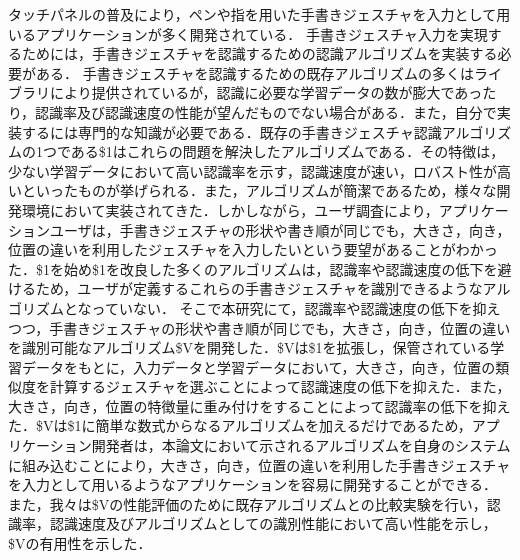 タッチパネルの普及により，ペンや指を用いた手書きジェスチャを入力として用いるアプリケーションが多く開発されている．
手書きジェスチャ入力を実現するためには，手書きジェスチャを認識するための認識アルゴリズムを実装する必要がある．
手書きジェスチャを認識するための既存アルゴリズムの多くはライブラリにより提供されているが，認識に必要な学習データの数が膨大であったり，認識率及び認識速度の性能が望んだものでない場合がある．また，自分で実装するには専門的な知識が必要である．既存の手書きジェスチャ認識アルゴリズムの1つである\$1はこれらの問題を解決したアルゴリズムである．その特徴は，少ない学習データにおいて高い認識率を示す，認識速度が速い，ロバスト性が高いといったものが挙げられる．また，アルゴリズムが簡潔であるため，様々な開発環境において実装されてきた．しかしながら，ユーザ調査により，アプリケーションユーザは，手書きジェスチャの形状や書き順が同じでも，大きさ，向き，位置の違いを利用したジェスチャを入力したいという要望があることがわかった．\$1を始め\$1を改良した多くのアルゴリズムは，認識率や認識速度の低下を避けるため，ユーザが定義するこれらの手書きジェスチャを識別できるようなアルゴリズムとなっていない．
そこで本研究にて，認識率や認識速度の低下を抑えつつ，手書きジェスチャの形状や書き順が同じでも，大きさ，向き，位置の違いを識別可能なアルゴリズム\$Vを開発した．\$Vは\$1を拡張し，保管されている学習データをもとに，入力データと学習データにおいて，大きさ，向き，位置の類似度を計算するジェスチャを選ぶことによって認識速度の低下を抑えた．また，大きさ，向き，位置の特徴量に重み付けをすることによって認識率の低下を抑えた．\$Vは\$1に簡単な数式からなるアルゴリズムを加えるだけであるため，アプリケーション開発者は，本論文において示されるアルゴリズムを自身のシステムに組み込むことにより，大きさ，向き，位置の違いを利用した手書きジェスチャを入力として用いるようなアプリケーションを容易に開発することができる．
また，我々は\$Vの性能評価のために既存アルゴリズムとの比較実験を行い，認識率，認識速度及びアルゴリズムとしての識別性能において高い性能を示し，\$Vの有用性を示した．